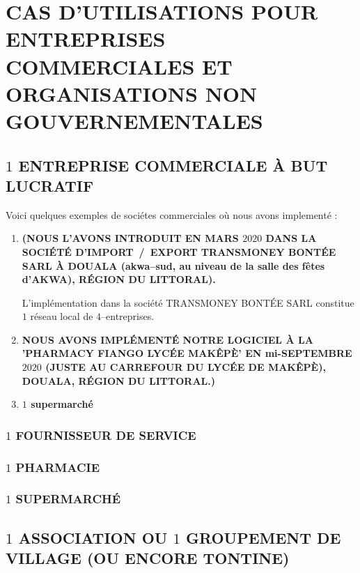 \chapter{CAS D'UTILISATIONS POUR ENTREPRISES COMMERCIALES ET ORGANISATIONS NON GOUVERNEMENTALES}

\vspace{-2em}


\vspace{1em}

\section{$1$ ENTREPRISE COMMERCIALE \`A BUT LUCRATIF}

Voici quelques exemples de soci\'etes commerciales
o\`u nous avons implement\'e \yerotherpblack:


\begin{enumerate}[1.]
	\item \textbf{ (NOUS L'AVONS INTRODUIT
		EN MARS $2020$ DANS LA SOCI\'ET\'E D'IMPORT~/~EXPORT TRANSMONEY BONT\'EE SARL
		\`A DOUALA (akwa--sud, au niveau de la salle des f\^etes
		d'AKWA), R\'EGION DU LITTORAL).}
		
		L'implémentation dans la société TRANSMONEY BONTÉE SARL
		constitue $1$ réseau local de $4$--entreprises.
				
	\item \textbf{
		NOUS AVONS IMPL\'EMENT\'E NOTRE LOGICIEL \`A LA
		'PHARMACY FIANGO LYC\'EE MAK\^EP\`E' EN mi-SEPTEMBRE $2020$
		(JUSTE AU CARREFOUR DU LYC\'EE DE MAK\^EP\`E), DOUALA,
		R\'EGION DU LITTORAL.)}

	\item \textbf{$1$ supermarch\'e}
\end{enumerate}


\newpage


\subsection{$1$ FOURNISSEUR DE SERVICE}


\newpage


\subsection{$1$ PHARMACIE}


\newpage


\subsection{$1$ SUPERMARCH\'E}


\newpage


\section{$1$ ASSOCIATION OU $1$ GROUPEMENT DE VILLAGE (OU ENCORE TONTINE)}